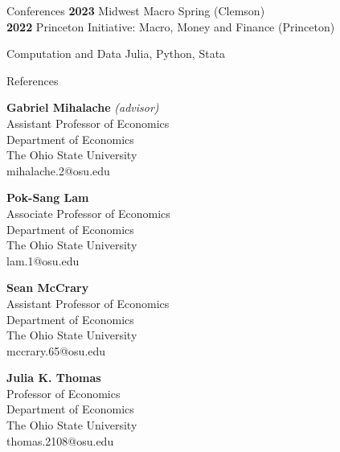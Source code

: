 \documentclass{cv} %
\begin{document}
\newpage
\begin{rSection}{Conferences}
{\bf 2023} Midwest Macro Spring (Clemson) \\
{\bf 2022} Princeton Initiative: Macro, Money and Finance (Princeton)
\end{rSection}
\bigskip


\begin{rSection}{Computation and Data}
Julia, Python, Stata
\end{rSection}
\bigskip

\begin{rSection}{References} 
\begin{minipage}{6cm}
	{\bf Gabriel Mihalache} \emph{(advisor)} \\
	Assistant Professor of Economics \\
	Department of Economics \\
	The Ohio State University \\
	mihalache.2@osu.edu
\end{minipage}
\begin{minipage}{6cm}
	{\bf Pok-Sang Lam} \\
	Associate Professor of Economics \\
	Department of Economics \\
	The Ohio State University \\
	lam.1@osu.edu
\end{minipage}
\begin{minipage}{6cm}
	{\bf Sean McCrary} \\
	Assistant Professor of Economics \\
	Department of Economics \\
	The Ohio State University \\
	mccrary.65@osu.edu
\end{minipage}

\bigskip
\begin{minipage}{6cm}
	{\bf Julia K. Thomas} \\
	Professor of Economics \\
	Department of Economics \\
	The Ohio State University \\
	thomas.2108@osu.edu
\end{minipage}

\end{rSection}
\end{document}
